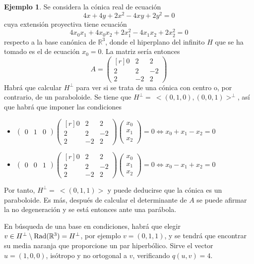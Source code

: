 \documentclass[12pt]{report}
\theoremstyle{definition}
\theoremstyle{definition}
\newtheorem{example}{Ejemplo}[chapter]
\theoremstyle{remark}
\newcommand{\R}{\mathbb R}
\begin{document}
\begin{example}
Se considera la cónica real de ecuación
\[4x+4y+2x^2-4xy+2y^2=0\]
cuya extensión proyectiva tiene ecuación
\[4x_0x_1+4x_0x_2+2x_1^2-4x_1x_2+2x_2^2=0\]
respecto a la base canónica de $\R^3$, donde el hiperplano del infinito $H$ que se ha tomado es el de ecuación $x_0 = 0$. La matriz sería entonces
\[A = \begin{pmatrix*}[r]
    0 & 2 & 2 \\
    2 & 2 & -2 \\
    2 & -2 & 2
\end{pmatrix*}\]
Habrá que calcular $H^\perp$ para ver si se trata de una cónica con centro o, por contrario, de un paraboloide. Se tiene que $H^\perp = \ <(0,1,0),(0,0,1)>^\perp$, así que habrá que imponer las condiciones
\begin{itemize}
    \item $\displaystyle \begin{pmatrix}
        0 & 1 & 0 
    \end{pmatrix}
\begin{pmatrix*}[r]
    0 & 2 & 2 \\
    2 & 2 & -2 \\
    2 & -2 & 2
\end{pmatrix*} \begin{pmatrix}
        x_0 \\
        x_1 \\
        x_2
    \end{pmatrix} = 0 \iff x_0+x_1-x_2=0$
   \item $\displaystyle \begin{pmatrix}
        0 & 0 & 1 
    \end{pmatrix}
\begin{pmatrix*}[r]
    0 & 2 & 2 \\
    2 & 2 & -2 \\
    2 & -2 & 2
\end{pmatrix*} \begin{pmatrix}
        x_0 \\
        x_1 \\
        x_2
    \end{pmatrix} = 0 \iff x_0-x_1+x_2 = 0$
\end{itemize}
Por tanto, $H^\perp = \ <(0,1,1)>$ y puede deducirse que la cónica es un paraboloide. Es más, después de calcular el determinante de $A$ se puede afirmar la no degeneración y se está entonces ante una parábola. 

\vspace{3mm}
\noindent En búsqueda de una base en condiciones, habrá que elegir $v \in H^\perp \setminus \textup{Rad}(\R^3) = H^\perp$, por ejemplo $v = (0,1,1)$, y se tendrá que encontrar su media naranja que proporcione un par hiperbólico. Sirve el vector $u = (1,0,0)$, isótropo y no ortogonal a $v$, verificando $q(u,v) = 4$. 


\end{example}
\end{document}
